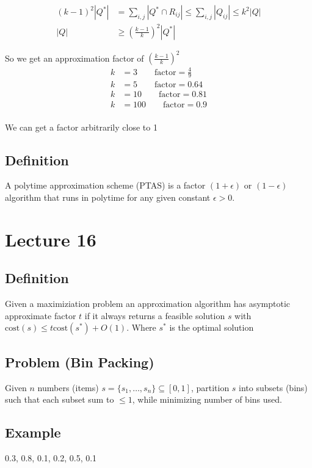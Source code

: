 \documentclass[english,12pt]{article}
\theoremstyle{plain}
\theoremstyle{definition}
\theoremstyle{definition} %
\begin{document}
\begin{align*}
(k-1)^2|Q^\ast|&=\sum_{i,j}|Q^\ast\cap R_{ij}|
\le\sum_{i,j}|Q_{ij}|
\le k^2|Q|\\
|Q|&\ge \left(\frac{k-1}{k}\right)^2|Q^\ast|
\end{align*}

So we get an approximation factor of $\left(\frac{k-1}{k}\right)^2$
\begin{align*}
k&=3 \qquad \text{factor}=\frac{4}{9}\\
k&=5 \qquad \text{factor}=0.64\\
k&=10 \qquad \text{factor}=0.81\\
k&=100 \qquad \text{factor}=0.9\\
\end{align*}

We can get a factor arbitrarily close to 1

\subsection{Definition}
A polytime approximation scheme (PTAS) is a factor $(1+\epsilon)$ or $(1-\epsilon)$ algorithm that runs in polytime for any given constant $\epsilon > 0$.

\section{Lecture 16}
\subsection{Definition}
Given a maximiziation problem an approximation algorithm has asymptotic approximate factor $t$ if it always returns a feasible solution $s$ with $\text{cost}(s)\le t\text{cost}(s^\ast) + O(1)$.  Where $s^\ast$ is the optimal solution

\subsection{Problem (Bin Packing)}
Given $n$ numbers (items) $s=\{s_1,\ldots, s_n\}\subseteq [0, 1]$, partition $s$ into subsets (bins) such that each subset sum to $\le 1$, while minimizing number of bins used.

\subsection{Example}
0.3, 0.8, 0.1, 0.2, 0.5, 0.1
\end{document}
